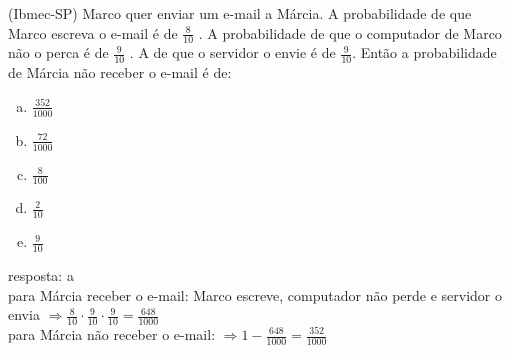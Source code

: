 \begin{ex}
(Ibmec-SP) Marco quer enviar um e-mail a Márcia. A probabilidade de que Marco escreva o e-mail é de $\frac{8}{10}$ . A probabilidade de que o computador de Marco não o perca é de $\frac{9}{10}$ .  A de que o servidor o envie é de $\frac{9}{10}$. Então a probabilidade de Márcia não receber o e-mail é de:
   \begin{enumerate}[(a)]
   \item $\frac{352}{1000}$
   \item $\frac{72}{1000}$
   \item $\frac{8}{100}$
   \item $\frac{2}{10}$
   \item $\frac{9}{10}$
   \end{enumerate}
     \begin{sol}
      resposta: a \\
      para Márcia receber o e-mail: Marco escreve, computador não perde e servidor  o envia 
      $\Longrightarrow \frac{8}{10}\cdot\frac{9}{10}\cdot\frac{9}{10}=\frac{648}{1000}$ \\
      para Márcia não receber o e-mail:
       $\Longrightarrow 1 - \frac{648}{1000}= \frac{352}{1000}$
     \end{sol}
\end{ex}